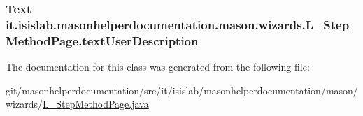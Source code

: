 \hypertarget{classit_1_1isislab_1_1masonhelperdocumentation_1_1mason_1_1wizards_1_1_l___step_method_page_a7cb65b64022898b986f913f4a7ae43d3}{
\subsubsection[{text\-User\-Description}]{\setlength{\rightskip}{0pt plus 5cm}Text it.\-isislab.\-masonhelperdocumentation.\-mason.\-wizards.\-L\-\_\-\-Step\-Method\-Page.\-text\-User\-Description\hspace{0.3cm}{\ttfamily [private]}}}\label{classit_1_1isislab_1_1masonhelperdocumentation_1_1mason_1_1wizards_1_1_l___step_method_page_a7cb65b64022898b986f913f4a7ae43d3}


The documentation for this class was generated from the following file\-:\begin{DoxyCompactItemize}
\item 
git/masonhelperdocumentation/src/it/isislab/masonhelperdocumentation/mason/wizards/\hyperlink{_l___step_method_page_8java}{L\-\_\-\-Step\-Method\-Page.\-java}\end{DoxyCompactItemize}

